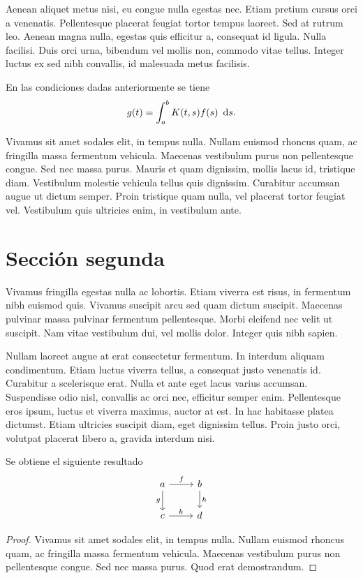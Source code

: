 \documentclass[oneside,openright,titlepage,numbers=noenddot,openany,headinclude,footinclude=true,
cleardoublepage=empty,abstractoff,BCOR=5mm,paper=a4,fontsize=12pt,main=spanish]{scrreprt}
\begin{document}
Aenean aliquet metus nisi, eu congue nulla egestas nec. Etiam pretium
cursus orci a venenatis. Pellentesque placerat feugiat tortor tempus
laoreet. Sed at rutrum leo. Aenean magna nulla, egestas quis efficitur
a, consequat id ligula. Nulla facilisi. Duis orci urna, bibendum vel
mollis non, commodo vitae tellus. Integer luctus ex sed nibh
convallis, id malesuada metus facilisis.

\begin{theorem}
En las condiciones dadas anteriormente se tiene
\[
g(t) = \int^b_a K(t,s)f(s)\ \mathop{}\!\mathrm{d} s.
\]
\end{theorem}

Vivamus sit amet sodales elit, in tempus nulla. Nullam euismod rhoncus
quam, ac fringilla massa fermentum vehicula. Maecenas vestibulum purus
non pellentesque congue. Sed nec massa purus. Mauris et quam
dignissim, mollis lacus id, tristique diam. Vestibulum molestie
vehicula tellus quis dignissim. Curabitur accumsan augue ut dictum
semper. Proin tristique quam nulla, vel placerat tortor feugiat
vel. Vestibulum quis ultricies enim, in vestibulum ante.

\chapter{Sección segunda}
Vivamus fringilla egestas nulla ac lobortis. Etiam viverra est risus,
in fermentum nibh euismod quis. Vivamus suscipit arcu sed quam dictum
suscipit. Maecenas pulvinar massa pulvinar fermentum
pellentesque. Morbi eleifend nec velit ut suscipit. Nam vitae
vestibulum dui, vel mollis dolor. Integer quis nibh sapien.

Nullam laoreet augue at erat consectetur fermentum. In interdum
aliquam condimentum. Etiam luctus viverra tellus, a consequat justo
venenatis id. Curabitur a scelerisque erat. Nulla et ante eget lacus
varius accumsan. Suspendisse odio nisl, convallis ac orci nec,
efficitur semper enim. Pellentesque eros ipsum, luctus et viverra
maximus, auctor at est. In hac habitasse platea dictumst. Etiam
ultricies suscipit diam, eget dignissim tellus. Proin justo orci,
volutpat placerat libero a, gravida interdum nisi.

\begin{corollary}
Se obtiene el siguiente resultado
\[\begin{tikzcd}
a\rar{f} \dar[swap]{g} & b \dar{h} \\
c\rar{k} & d
\end{tikzcd}\]
\end{corollary}
\begin{proof}
  Vivamus sit amet sodales elit, in tempus nulla. Nullam euismod
  rhoncus quam, ac fringilla massa fermentum vehicula. Maecenas
  vestibulum purus non pellentesque congue. Sed nec massa purus.
  Quod erat demostrandum.
\end{proof}
\end{document}
